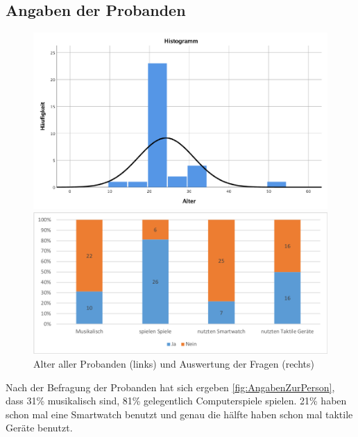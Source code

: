 
\subsection{Angaben der Probanden}

\begin{figure}[htbp] 
	\centering
	\begin{minipage}[t]{0.4\textwidth}
		\includegraphics[width=\textwidth]{pics/analyse/person/alter.png}
	\end{minipage}
	\begin{minipage}[t]{0.4\textwidth}
		\includegraphics[width=\textwidth]{pics/analyse/person/questions.png}
	\end{minipage}
	\caption{Alter aller Probanden (links) und Auswertung der Fragen (rechts)}
	\label{fig:AngabenZurPerson}
\end{figure}

Nach der Befragung der Probanden hat sich ergeben \autoref{fig:AngabenZurPerson}, dass 31\% musikalisch sind, 81\% gelegentlich Computerspiele spielen. 21\% haben schon mal eine Smartwatch benutzt und genau die h{\"a}lfte haben schon mal taktile Ger{\"a}te benutzt.

